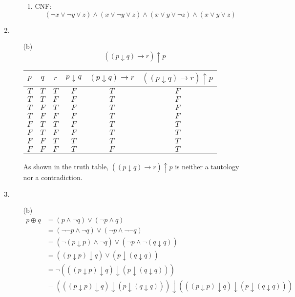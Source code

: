 \documentclass[fleqn]{article}
\begin{document}
\begin{enumerate}
\begin{enumerate}
\begin{enumerate}
			\item %
			CNF:
			\[(\lnot x \lor \lnot y \lor z) \land (x \lor \lnot y \lor z) \land (x \lor y \lor \lnot z) \land (x \lor y \lor z)\]
		\end{enumerate}
	\end{enumerate}

	\item %
	\begin{enumerate}
		\item[(b)]
		\[((p \downarrow q) \rightarrow r) \uparrow p\]
		\begin{tabular}{||c|c|c||c|c|c||}
			\hline
			\(p\) & \(q\) & \(r\) & \(p \downarrow q\) & \((p \downarrow q) \rightarrow r\) & \(((p \downarrow q) \rightarrow r) \uparrow p\) \\
			\hline
			\(T\) & \(T\) & \(T\) & \(F\) & \(T\) & \(F\) \\
			\(T\) & \(T\) & \(F\) & \(F\) & \(T\) & \(F\) \\
			\(T\) & \(F\) & \(T\) & \(F\) & \(T\) & \(F\) \\
			\(T\) & \(F\) & \(F\) & \(F\) & \(T\) & \(F\) \\
			\(F\) & \(T\) & \(T\) & \(F\) & \(T\) & \(T\) \\
			\(F\) & \(T\) & \(F\) & \(F\) & \(T\) & \(T\) \\
			\(F\) & \(F\) & \(T\) & \(T\) & \(T\) & \(T\) \\
			\(F\) & \(F\) & \(F\) & \(T\) & \(F\) & \(T\) \\
			\hline
		\end{tabular}

		As shown in the truth table, \(((p \downarrow q) \rightarrow r) \uparrow p\) is neither a tautology nor a contradiction.
	\end{enumerate}

	\item %
	\begin{enumerate}
		\item[(b)]
		\begin{align*}
			p \oplus q &= (p \land \lnot q) \lor (\lnot p \land q) \\
			&= (\lnot \lnot p \land \lnot q) \lor (\lnot p \land \lnot \lnot q) \\
			&= (\lnot (p \downarrow p) \land \lnot q) \lor (\lnot p \land \lnot (q \downarrow q)) \\
			&= ((p \downarrow p) \downarrow q) \lor (p \downarrow (q \downarrow q)) \\
			&= \lnot (((p \downarrow p) \downarrow q) \downarrow (p \downarrow (q \downarrow q))) \\
			&= (((p \downarrow p) \downarrow q) \downarrow (p \downarrow (q \downarrow q))) \downarrow (((p \downarrow p) \downarrow q) \downarrow (p \downarrow (q \downarrow q))) \\
		\end{align*}
	\end{enumerate}


\end{enumerate}
\end{document}
